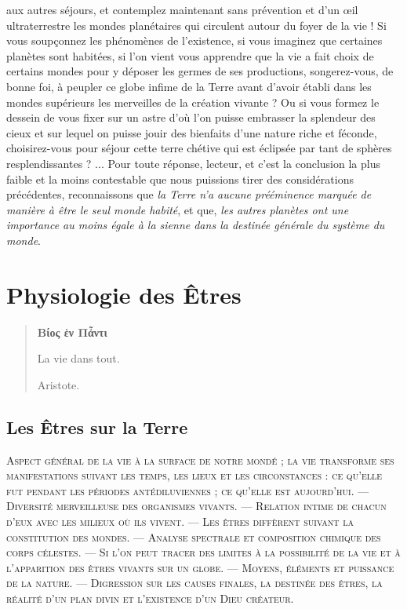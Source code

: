 \documentclass[a4paper, 11pt, oneside, landscape]{article}
\begin{document}
aux autres séjours, et contemplez maintenant sans prévention et d'un œil ultraterrestre les mondes planétaires qui circulent autour du foyer de la vie ! Si vous soupçonnez les phénomènes de l'existence, si vous imaginez que certaines planètes sont habitées, si l'on vient vous apprendre que la vie a fait choix de certains mondes pour y déposer les germes de ses productions, songerez-vous, de bonne foi, à peupler ce globe infime de la Terre avant d'avoir établi dans les mondes supérieurs les merveilles de la création vivante ? Ou si vous formez le dessein de vous fixer sur un astre d'où l'on puisse embrasser la splendeur des cieux et sur lequel on puisse jouir des bienfaits d'une nature riche et féconde, choisirez-vous pour séjour cette terre chétive qui est éclipsée par tant de sphères resplendissantes ? ... Pour toute réponse, lecteur, et c'est la conclusion la plus faible et la moins contestable que nous puissions tirer des considérations précédentes, reconnaissons que \emph{la Terre n'a aucune prééminence marquée de manière à être le seul monde habité}, et que, \emph{les autres planètes ont une importance au moins égale à la sienne dans la destinée générale du système du monde}.
\clearpage
\section{Physiologie des Êtres}
\begin{quotation}\bfseries\small
Βίος ἑν Πἆντι

La vie dans tout.

\hspace*{5mm}Aristote.
\end{quotation}

\bigskip

\subsection{Les Êtres sur la Terre}
\begin{center}
\scshape
\small
Aspect général de la vie à la surface de notre mondé ; la vie transforme ses manifestations suivant les temps, les lieux et les circonstances : ce qu'elle fut pendant les périodes antédiluviennes ; ce qu'elle est aujourd'hui. --- Diversité merveilleuse des organismes vivants. --- Relation intime de chacun d'eux avec les milieux où ils vivent. --- Les êtres diffèrent suivant la constitution des mondes. --- Analyse spectrale et composition chimique des corps célestes. --- Si l'on peut tracer des limites à la possibilité de la vie et à l'apparition des êtres vivants sur un globe. --- Moyens, éléments et puissance de la nature. --- Digression sur les causes finales, la destinée des êtres, la réalité d'un plan divin et l'existence d'un Dieu créateur.
\end{center}
\end{document}
